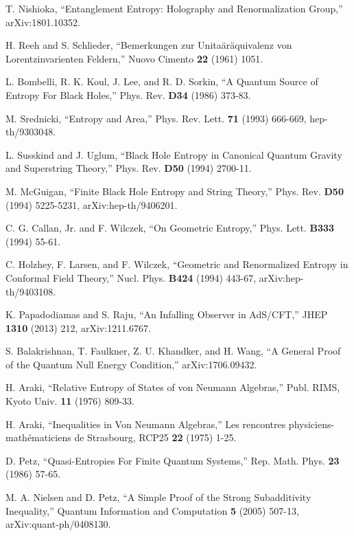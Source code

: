 \documentclass[12pt]{article}
\numberwithin{equation}{section}
\begin{document}

\begin{thebibliography}{99}
T. Nishioka, ``Entanglement Entropy: Holography and Renormalization Group,'' 
arXiv:1801.10352.

H. Reeh and S. Schlieder, ``Bemerkungen zur Unita\"{a}r\"{a}quivalenz von Lorentzinvarienten Feldern,'' Nuovo Cimento {\bf 22} (1961) 1051.

L. Bombelli, R. K. Koul, J. Lee, and R. D. Sorkin, ``A Quantum Source of Entropy
For Black Holes,'' Phys. Rev. {\bf D34} (1986) 373-83.

M. Srednicki, ``Entropy and Area,'' Phys. Rev. Lett. {\bf 71} (1993) 666-669, hep-th/9303048.

L. Susskind and J. Uglum, ``Black Hole Entropy in Canonical Quantum Gravity and Superstring Theory,''
Phys. Rev. {\bf D50} (1994) 2700-11.


M. McGuigan, ``Finite Black Hole Entropy and String Theory,'' Phys. Rev. {\bf D50} (1994) 5225-5231, arXiv:hep-th/9406201.

C. G. Callan, Jr. and F. Wilczek, ``On Geometric Entropy,'' Phys. Lett. {\bf B333} (1994) 55-61.

C. Holzhey, F. Larsen, and F. Wilczek, ``Geometric and Renormalized Entropy in Conformal Field Theory,'' Nucl. Phys. {\bf B424} (1994)
443-67, arXiv:hep-th/9403108.

K. Papadodiamas and S. Raju, ``An Infalling Observer in AdS/CFT,''
JHEP {\bf 1310} (2013) 212, arXiv:1211.6767.

S. Balakrishnan, T. Faulkner, Z. U. Khandker,
and H. Wang, ``A General Proof of the Quantum Null Energy Condition,''
arXiv:1706.09432.

H. Araki, ``Relative Entropy of States of von Neumann Algebras,'' Publ. RIMS, Kyoto Univ.
{\bf 11} (1976) 809-33.

H. Araki, ``Inequalities in Von Neumann Algebras,'' Les rencontres physiciens-math\'{e}maticiens de Strasbourg, RCP25 {\bf 22} (1975) 1-25.


D. Petz, ``Quasi-Entropies For Finite Quantum Systems,'' Rep. Math. Phys. {\bf 23} (1986) 57-65.

M. A. Nielsen and D. Petz,  ``A Simple Proof of the Strong Subadditivity Inequality,'' Quantum Information and Computation {\bf 5} (2005)
507-13, arXiv:quant-ph/0408130.


\end{thebibliography}
\end{document}
